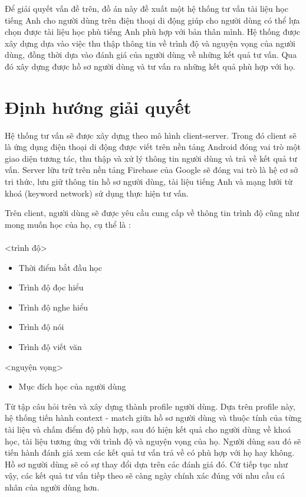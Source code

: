 Để giải quyết vấn đề trên, đồ án	 này đề xuất một hệ thống tư vấn tài liệu học tiếng Anh cho người dùng trên điện thoại di động giúp cho người dùng có thể lựa chọn được tài liệu học phù tiếng Anh phù hợp với bản thân mình. Hệ thống được xây dựng dựa vào việc thu thập thông tin về trình độ và nguyện vọng của người dùng, đồng thời dựa vào đánh giá của người dùng về những kết quả tư vấn. Qua đó xây dựng được hồ sơ người dùng và tư vấn ra những kết quả phù hợp với họ. 

\section{Định hướng giải quyết}

Hệ thống tư vấn sẽ được xây dựng theo mô hình client-server. Trong đó client sẽ là ứng dụng điện thoại di động được viết trên nền tảng Android đóng vai trò một giao diện tương tác, thu thập và xử lý thông tin người dùng và trả về kết quả tư vấn. Server lữu trữ trên nền tảng Firebase của Google sẽ đóng vai trò là hệ cơ sở tri thức, lưu giữ thông tin hồ sơ người dùng, tài liệu tiếng Anh và mạng lưới từ khoá (keyword network) sử dụng thực hiện tư vấn. 

Trên client, người dùng sẽ được yêu cầu cung cấp về thông tin trình độ cũng như mong muốn học của họ, cụ thể là : \\\\
<trình độ>
\begin{itemize}  
        \item Thời điểm bắt đầu học 
        \item Trình độ đọc hiểu
        \item Trình độ nghe hiểu
        \item Trình độ nói
        \item Trình độ viết văn
    \end{itemize}
<nguyện vọng>  
\begin{itemize}  
        \item Mục đích học của người dùng
    \end{itemize}
    
Từ tập câu hỏi trên và xây dựng thành profile người dùng. Dựa trên profile này, hệ thống tiến hành context - match giữa hồ sơ người dùng và thuộc tính của từng tài liệu và chấm điểm độ phù hợp, sau đó hiện kết quả cho người dùng về khoá học, tài liệu tương ứng với trình độ và nguyện vọng của họ. Người dùng sau đó sẽ tiến hành đánh giá xem các kết quả tư vấn trả về có phù hợp với họ hay không. Hồ sơ người dùng sẽ có sự thay đổi dựa trên các đánh giá đó. Cứ tiếp tục như vậy, các kết quả tư vấn tiếp theo sẽ càng ngày chính xác đúng với nhu cầu cá nhân của người dùng hơn.

